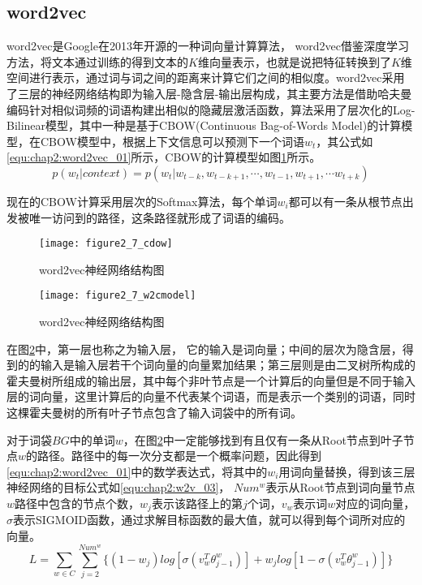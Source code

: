 \subsection{word2vec}
word2vec是Google在2013年开源的一种词向量计算算法， word2vec借鉴深度学习方法，将文本通过训练的得到文本的$K$维向量表示，也就是说把特征转换到了$K$维空间进行表示，通过词与词之间的距离来计算它们之间的相似度。word2vec采用了三层的神经网络结构即为输入层-隐含层-输出层构成，其主要方法是借助哈夫曼编码针对相似词频的词语构建出相似的隐藏层激活函数，算法采用了层次化的Log-Bilinear模型，其中一种是基于CBOW(Continuous Bag-of-Words Model)的计算模型，在CBOW模型中，根据上下文信息可以预测下一个词语$w_{t}$，其公式如\ref{equ:chap2:word2vec_01}所示，CBOW的计算模型如图\ref{fig:2_7_cdow}所示。
\begin{equation}
\label{equ:chap2:word2vec_01}
p(w_{t}|context)=p(w_{t}|w_{t-k},w_{t-k+1},\cdots ,w_{t-1},w_{t+1},\cdots w_{t+k})
\end{equation}
\par 现在的CBOW计算采用层次的Softmax算法，每个单词$w_{i}$都可以有一条从根节点出发被唯一访问到的路径，这条路径就形成了词语的编码。
\begin{figure}[htp]
\centering
\texttt{[image: figure2\_7\_cdow]}
\caption{word2vec神经网络结构图}
\label{fig:2_7_cdow}
\end{figure}
\begin{figure}[htp]
\centering
\texttt{[image: figure2\_7\_w2cmodel]}
\caption{word2vec神经网络结构图}
\label{fig:2_7}
\end{figure}
\par 在图\ref{fig:2_7}中，第一层也称之为输入层， 它的输入是词向量；中间的层次为隐含层，得到的的输入是输入层若干个词向量的向量累加结果；第三层则是由二叉树所构成的霍夫曼树所组成的输出层，其中每个非叶节点是一个计算后的向量但是不同于输入层的词向量，这里计算后的向量不代表某个词语，而是表示一个类别的词语，同时这棵霍夫曼树的所有叶子节点包含了输入词袋中的所有词。
\par 对于词袋$BG$中的单词$w$，在图\ref{fig:2_7}中一定能够找到有且仅有一条从Root节点到叶子节点$w$的路径。路径中的每一次分支都是一个概率问题，因此得到\ref{equ:chap2:word2vec_01}中的数学表达式，将其中的$w_{i}$用词向量替换，得到该三层神经网络的目标公式如\ref{equ:chap2:w2v_03}， $Num^{w}$表示从Root节点到词向量节点$w$路径中包含的节点个数，$w_{j}$表示该路径上的第$j$个词，$v_{w}$表示词$w$对应的词向量，$\sigma$表示SIGMOID函数，通过求解目标函数的最大值，就可以得到每个词所对应的向量。
\begin{equation}
\label{equ:chap2:w2v_03}
L=\sum_{w\in C}\sum_{j=2}^{Num^{w}}\{(1-w_{j})log[\sigma(v_{w}^{T}\theta_{j-1}^{w})]+w_{j}log[1-\sigma(v_{w}^{T}\theta_{j-1}^{w})]\}
\end{equation}
